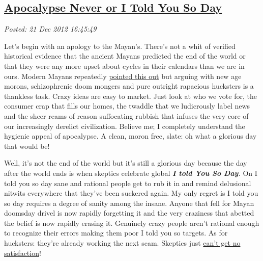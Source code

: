%

\subsection*{\href{https://bakerjd99.wordpress.com/2012/12/21/apocalypse-never-or-i-told-you-so-day/}{Apocalypse Never or I Told You So Day}}


\noindent\emph{Posted: 21 Dec 2012 16:45:49}
\vspace{6pt}

Let's begin with an apology to the Mayan's. There's not a whit of
verified historical evidence that the ancient Mayans predicted the end
of the world or that they were any more upset about cycles in their
calendars than we are in ours. Modern Mayans repeatedly
\href{http://boingboing.net/2009/10/13/what-actual-mayans-a.html}{pointed
this out} but arguing with new age morons, schizophrenic doom mongers
and pure outright rapacious hucksters is a thankless task. Crazy ideas
are easy to market. Just look at who we vote for, the consumer crap that
fills our homes, the twaddle that we ludicrously label news and the
sheer reams of reason suffocating rubbish that infuses the very core of
our increasingly derelict civilization. Believe me; I completely
understand the hygienic appeal of apocalypse. A clean, moron free,
slate: oh what a glorious day that would be!

Well, it's not the end of the world but it's still a glorious day
because the day after the world ends is when skeptics celebrate global
\emph{\textbf{I told You So Day}.} On I told you so day sane and
rational people get to rub it in and remind delusional nitwits
everywhere that they've been suckered again. My only regret is I told
you so day requires a degree of sanity among the insane. Anyone that
fell for Mayan doomsday drivel is now rapidly forgetting it and the very
craziness that abetted the belief is now rapidly erasing it. Genuinely
crazy people aren't rational enough to recognize their errors making
them poor I told you so targets. As for hucksters: they're already
working the next scam. Skeptics just
\href{http://www.youtube.com/watch?v=Lx0bLBk-BNM}{can't get no
satisfaction}!



